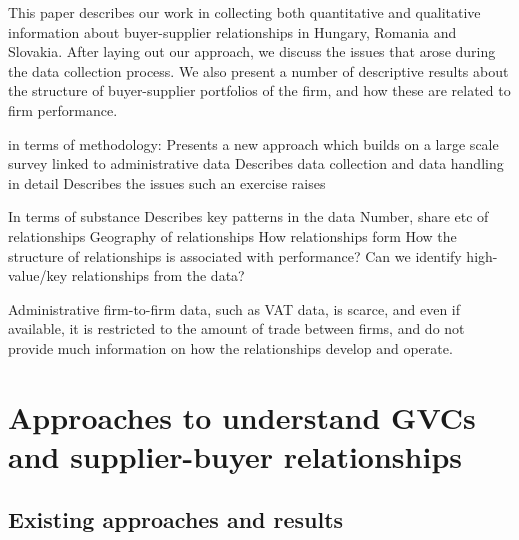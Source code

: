 \documentclass[final, dvipsnames, authoryear,12pt]{elsarticle}
\begin{document}
This paper describes our work in collecting both quantitative and qualitative information about buyer-supplier relationships in Hungary, Romania and Slovakia. After laying out our approach, we discuss the issues that arose during the data collection process. We also present a number of descriptive results about the structure of buyer-supplier portfolios of the firm, and how these are related to firm performance.

in terms of methodology: 
Presents a new approach which builds on a large scale survey linked to administrative data
Describes data collection and data handling in detail
Describes the issues such an exercise raises

In terms of substance
Describes key patterns in the data
Number, share etc of relationships
Geography of relationships
How relationships form
How the structure of relationships is associated with performance?
Can we identify high-value/key relationships from the data?



Administrative firm-to-firm data, such as VAT data, is scarce, and even if available, it is restricted to the amount of trade between firms, and do not provide much information on how the relationships develop and operate.

\section{Approaches to understand GVCs and supplier-buyer relationships} 
\label{sec: approach}

\subsection{Existing approaches and results}
\end{document}
